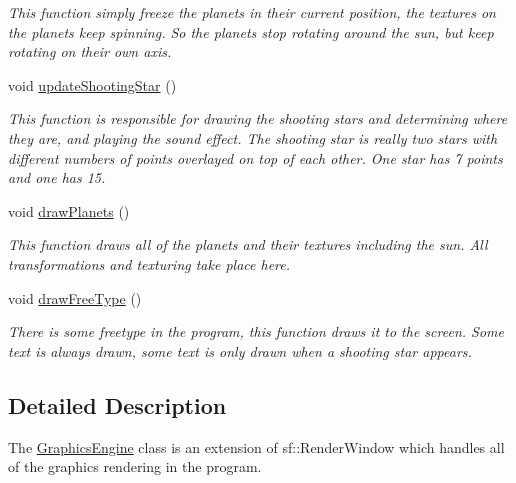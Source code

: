 \begin{DoxyCompactItemize}
\begin{DoxyCompactList}\small\item\em This function simply freeze the planets in their current position, the textures on the planets keep spinning. So the planets stop rotating around the sun, but keep rotating on their own axis. \end{DoxyCompactList}\item 
\mbox{\label{class_graphics_engine_a4ef85106db546a32e10e246c8e047d49}} 
void \hyperlink{class_graphics_engine_a4ef85106db546a32e10e246c8e047d49}{update\+Shooting\+Star} ()
\begin{DoxyCompactList}\small\item\em This function is responsible for drawing the shooting stars and determining where they are, and playing the sound effect. The shooting star is really two stars with different numbers of points overlayed on top of each other. One star has 7 points and one has 15. \end{DoxyCompactList}\item 
\mbox{\label{class_graphics_engine_aa246f8e379edd8bdc76b4b059ba88037}} 
void \hyperlink{class_graphics_engine_aa246f8e379edd8bdc76b4b059ba88037}{draw\+Planets} ()
\begin{DoxyCompactList}\small\item\em This function draws all of the planets and their textures including the sun. All transformations and texturing take place here. \end{DoxyCompactList}\item 
\mbox{\label{class_graphics_engine_aa55064f8007d7b16979712fa4c3973fa}} 
void \hyperlink{class_graphics_engine_aa55064f8007d7b16979712fa4c3973fa}{draw\+Free\+Type} ()
\begin{DoxyCompactList}\small\item\em There is some freetype in the program, this function draws it to the screen. Some text is always drawn, some text is only drawn when a shooting star appears. \end{DoxyCompactList}\end{DoxyCompactItemize}


\subsection{Detailed Description}
The \hyperlink{class_graphics_engine}{Graphics\+Engine} class is an extension of sf\+::\+Render\+Window which handles all of the graphics rendering in the program. 

